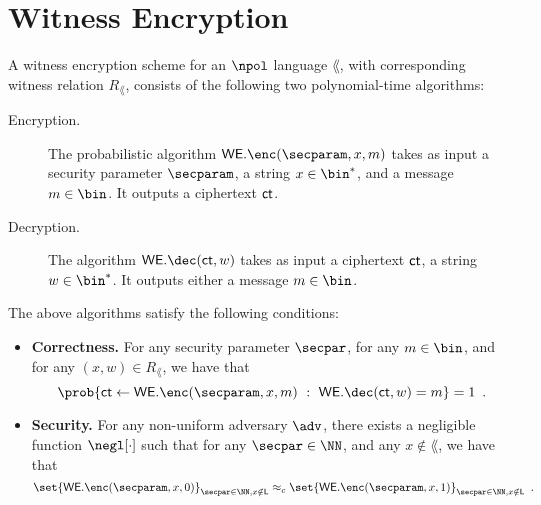 \section{Witness Encryption}

\begin{definition}
		A witness encryption scheme for an $\npol$ language $\lang$, with corresponding witness relation $R_\lang$, consists of the following two polynomial-time algorithms:
		
		\begin{description}
			\item[Encryption.] The probabilistic algorithm $\WE.\enc(\secparam,x,m)$ takes as input a security parameter $\secparam$, a string $x \in \bin^*$, and a message $m \in \bin$. It outputs a ciphertext $\mathsf{ct}$.
			\item[Decryption.] The algorithm $\WE.\dec(\ciphertext,w)$ takes as input a ciphertext $\mathsf{ct}$, a string $w \in \bin^*$. It outputs either a message $m \in \bin$.
		\end{description}
		The above algorithms satisfy the following conditions:
		\begin{itemize}
			\item \textbf{Correctness.} For any security parameter $\secpar$, for any $m \in \bin$, and for any $(x,w) \in R_\lang$, we have that
			\[
				\prob{\ciphertext \leftarrow \WE.\enc(\secparam,x,m)~:~ \WE.\dec(\ciphertext,w)=m} = 1\enspace.
			\]
			\item \textbf{Security.} For any non-uniform \ppt adversary $\adv$, there exists a negligible function $\negl[\cdot]$ such that for any $\secpar \in \NN$, and any $x \notin \lang$, we have that
			\[
				\set{\WE.\enc(\secparam,x,0)}_{\secpar \in \NN, x\notin \lang} \approx_c \set{\WE.\enc(\secparam,x,1)}_{\secpar \in \NN, x\notin \lang}\enspace.
			\]
		\end{itemize}
	\end{definition}

